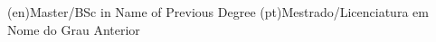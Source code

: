 %
%
%



%
%
%



%
%
%
\ntauthordegree(en){Master/BSc in Name of Previous Degree}
\ntauthordegree(pt){Mestrado/Licenciatura em Nome do Grau Anterior}



